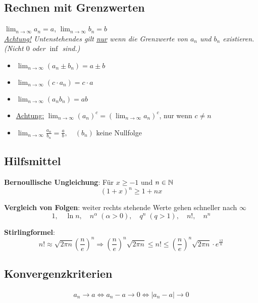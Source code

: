 \subsection{Rechnen mit Grenzwerten}
$\lim_{n \to \infty} a_n = a$, $\lim_{n \to \infty} b_n = b$\\
\emph{\underline{Achtung!} Untenstehendes gilt \underline{nur} wenn die Grenzwerte von $a_n$ und $b_n$ existieren. (Nicht $0$ oder $\inf$ sind.)}
\begin{itemize}[noitemsep,topsep=0pt]
	\item $\lim_{n \to \infty} (a_n \pm b_n) = a \pm b$
	\item $\lim_{n \to \infty} (c \cdot a_n) = c \cdot a$
	\item $\lim_{n \to \infty} (a_n b_n) = ab$
	\item \underline{Achtung:} $\lim_{n \to \infty} (a_n)^c = (\lim_{n \to
		\infty} a_n)^c$, nur wenn $c \neq n$
	\item $\lim_{n \to \infty} \frac{a_n}{b_n} = \frac{a}{b}, \quad (b_n)$ keine
	Nullfolge
\end{itemize}

\subsection{Hilfsmittel}
\textbf{Bernoullische Ungleichung}: Für $x \geq -1$ und $n \in \mathbb{N}$
\[
(1+x)^n \geq 1 + nx
\]


\textbf{Vergleich von Folgen}: weiter rechts stehende Werte gehen schneller nach
$\infty$
\[
1, \quad \ln n, \quad n^\alpha \; (\alpha > 0), \quad q^n \; (q > 1), \quad n!,
\quad n^n
\]

\textbf{Stirlingformel}:
\[
n! \approx \sqrt{2 \pi n} \left (\frac{n}{e} \right )^n
\Rightarrow \left ( \frac{n}{e} \right )^n \sqrt{2 \pi n} \leq n! \leq \left (
\frac{n}{e} \right )^n \sqrt{2 \pi n} \cdot e^\frac{12}{n}
\]

\subsection{Konvergenzkriterien}
\begin{align*}
	a_n \to a \Leftrightarrow a_n - a \to 0 \Leftrightarrow |a_n - a| \to 0
\end{align*}


